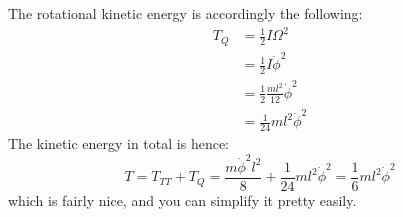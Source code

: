 The rotational kinetic energy is accordingly the following:
\begin{equation}
    \begin{split}
        T_{Q} 
        & = \frac{1}{2} I \Omega^{2}\\
        & = \frac{1}{2} I \dot{\phi}^{2}\\
        & = \frac{1}{2} \frac{ml^{2}}{12} \dot{\phi}^{2}\\
        & = \frac{1}{24} ml^{2}\dot{\phi}^{2}
    \end{split}
\end{equation}
The kinetic energy in total is hence: 
\begin{equation}
    T = T_{TT} + T_{Q} = \frac{m\dot{\phi}^{2}l^{2}}{8} + \frac{1}{24} ml^{2}\dot{\phi}^{2} = \frac{1}{6} ml^{2}\dot{\phi}^{2}
\end{equation}
which is fairly nice, and you can simplify it pretty easily. 
